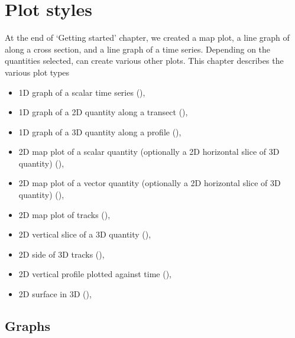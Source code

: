 
\chapter{Plot styles} \label{Chp:PlotStyles}
At the end of `Getting started' chapter, we created a map plot, a line graph of along a cross section, and a line graph of a time series.
Depending on the quantities selected, \QUICKPLOT can create various other plots.
This chapter describes the various plot types

\begin{itemize}
\item 1D graph of a scalar time series (),
\item 1D graph of a 2D quantity along a transect (),
\item 1D graph of a 3D quantity along a profile (),
\item 2D map plot of a scalar quantity (optionally a 2D horizontal slice of 3D quantity) (),
\item 2D map plot of a vector quantity (optionally a 2D horizontal slice of 3D quantity) (),
\item 2D map plot of tracks (),
\item 2D vertical slice of a 3D quantity (),
\item 2D side of 3D tracks (),
\item 2D vertical profile plotted against time (),
\item 2D surface in 3D (),
\end{itemize}

\section{Graphs} \label{Sec:PlotStyleGraph}

